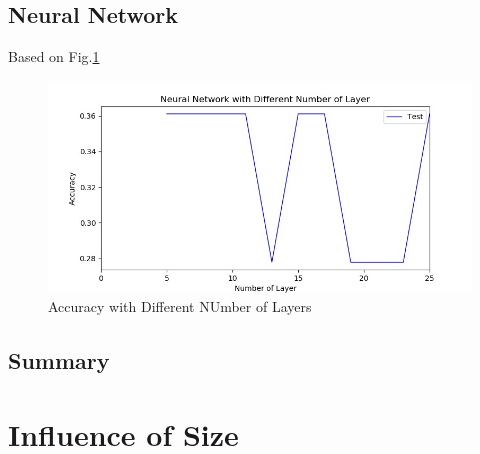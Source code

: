 \documentclass[11pt]{article}
\begin{document}
\subsection{Neural Network}
Based on Fig.\ref{fig:wine_nn}
\begin{figure}[h!]
  \includegraphics[width=\linewidth]{./wine/nn_num_layer.jpg}
  \caption{Accuracy with Different NUmber of Layers}
  \label{fig:wine_nn}
\end{figure}
\subsection{Summary}


\section{Influence of Size}
\end{document}
